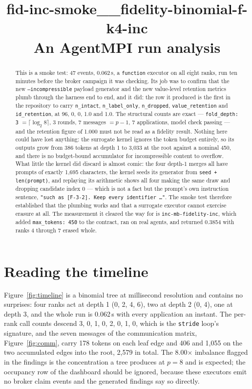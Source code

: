 \documentclass[11pt]{article}
\title{\textbf{fid-inc-smoke\_\_fidelity-binomial-f-k4-inc}\\[2pt]\large An AgentMPI run analysis}
\author{}
\date{}
\begin{document}
\maketitle

\begin{abstract}
This is a smoke test: 47 events, 0.062\,s, a \texttt{function} executor on all eight ranks,
run ten minutes before the broker campaign it was checking. Its job was to confirm that the
new \texttt{--incompressible} payload generator and the new value-level retention metrics
plumb through the harness end to end, and it did: the row it produced is the first in the
repository to carry \texttt{n\_intact}, \texttt{n\_label\_only}, \texttt{n\_dropped},
\texttt{value\_retention} and \texttt{id\_retention}, at 96, 0, 0, 1.0 and 1.0. The
structural counts are exact --- \texttt{fold\_depth: 3} $= \lceil\log_2 8\rceil$, 3 rounds,
7 messages $= p-1$, 7 applications, model check passing --- and the retention figure of
1.000 must not be read as a fidelity result. Nothing here could have lost anything: the
surrogate kernel ignores the token budget entirely, so its outputs grow from 386 tokens at
depth 1 to 3{,}033 at the root against a nominal 450, and there is no budget-bound
accumulator for incompressible content to overflow. What little the kernel did discard is
almost comic: the four depth-1 merges all have prompts of exactly 1{,}695 characters, the
kernel seeds its generator from \texttt{seed + len(prompt)}, and replaying its arithmetic
shows all four making the same draw and dropping candidate index 0 --- which is not a fact
but the prompt's own instruction sentence, \texttt{"such as [F-3-2]. Keep every identifier
\dots"}. The smoke test therefore established that the plumbing works and that a surrogate
executor cannot exercise erasure at all. The measurement it cleared the way for is
\texttt{inc-mb-fidelity-inc}, which added \texttt{max\_tokens: 450} to the contract, ran on
real agents, and returned 0.3854 with ranks 4 through 7 erased whole.
\end{abstract}



\section{Reading the timeline}

Figure~\ref{fig:timeline} is a binomial tree at millisecond resolution and contains no
surprises: four ranks act at depth 1 (0, 2, 4, 6), two at depth 2 (0, 4), one at depth 3,
and the whole run is 0.062\,s with every application an instant. The per-rank call counts
descend 3, 0, 1, 0, 2, 0, 1, 0, which is the \texttt{stride} loop's signature, and the seven
messages of the communication matrix, Figure~\ref{fig:comm}, carry 178 tokens on each leaf
edge and 406 and 1{,}055 on the two accumulated edges into the root, 2{,}579 in total. The
8.00$\times$ imbalance flagged in the findings is the concentration a tree produces at $p=8$
and is expected; the occupancy row of the dashboard should be ignored, because these
executors emit no broker claim events and the generated findings say so directly.
\end{document}
